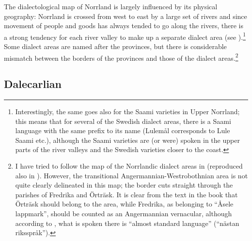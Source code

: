 The dialectological map of Norrland is largely influenced by its physical geography: Norrland is crossed from west to east by a large set of rivers and since movement of people and goods has always tended to go along the rivers, there is a strong tendency for each river valley to make up a separate dialect area (see ).\footnote{Interestingly, the same goes also for the Saami varieties in Upper Norrland; this means that for several of the Swedish dialect areas, there is a Saami language with the same prefix to its name (Lulemål corresponds to Lule Saami etc.), although the Saami varieties are (or were) spoken in the upper parts of the river valleys and the Swedish varieties closer to the coast.} Some dialect areas are named after the provinces, but there is considerable mismatch between the borders of the provinces and those of the dialect areas.\footnote{ I have tried to follow the map of the Norrlandic dialect areas in \citet[230]{ÅgrenEtAl1954} (reproduced also in \citealt{Dahlstedt1971}). However, the transitional Angermannian-Westrobothnian area is not quite clearly delineated in this map; the border cuts straight through the parishes of Fredrika and Örträsk. It is clear from the text in the book that Örträsk should belong to the area, while Fredrika, as belonging to “Åsele lappmark”, should be counted as an Angermannian vernacular, although according to \citet[289]{ÅgrenEtAl1954}, what is spoken there is “almost standard language” (“nästan riksspråk”). } 

\subsection{ Dalecarlian}

